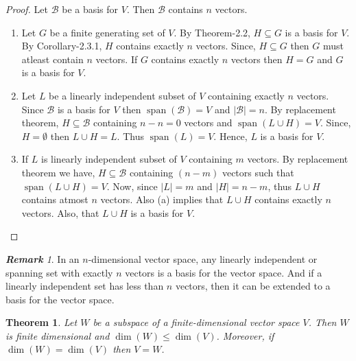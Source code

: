 \documentclass[12pt, a4paper]{article}
\newtheorem{theorem}{Theorem}[section]
\theoremstyle{definition}
\theoremstyle{remark}
\newtheorem*{remark}{\textbf{Remark}}
\newcommand{\B}{\mathscr{B}}
\DeclareMathOperator{\Span}{span}
\begin{document}
\begin{proof}
    Let $\B$ be a basis for $V$. Then $\B$ contains $n$ vectors.
    \begin{enumerate}
        \item Let $G$ be a finite generating set of $V$. By Theorem-2.2, $H \subseteq G$ is a basis for $V$. By Corollary-2.3.1, $H$ contains exactly $n$ vectors. Since, $H \subseteq G$ then $G$ must atleast contain $n$ vectors. If $G$ contains exactly $n$ vectors then $H = G$ and $G$ is a basis for $V$.
        \item Let $L$ be a linearly independent subset of $V$ containing exactly $n$ vectors. Since $\B$ is a basis for $V$ then $\Span(\B) = V$ and $|\B| = n$. By replacement theorem, $H \subseteq \B$ containing $n-n=0$ vectors and $\Span(L \cup H) = V$. Since, $H = \emptyset$ then $L \cup H = L$. Thus $\Span(L) = V$. Hence, $L$ is a basis for $V$.
        \item If $L$ is linearly independent subset of $V$ containing $m$ vectors. By replacement theorem we have, $H \subseteq \B$ containing $(n-m)$ vectors such that $\Span(L \cup H) = V$. Now, since $|L| = m$ and $|H| = n-m$, thus $L \cup H$ contains atmost $n$ vectors. Also (a) implies that $L \cup H$ contains exactly $n$ vectors. Also, that $L \cup H$ is a basis for $V$.
    \end{enumerate}
\end{proof}

\begin{remark}
    In an $n$-dimensional vector space, any linearly independent or spanning set with exactly $n$ vectors is a basis for the vector space. And if a linearly independent set has less than $n$ vectors, then it can be extended to a basis for the vector space.
\end{remark}

\begin{theorem}
    Let $W$ be a subspace of a finite-dimensional vector space $V$. Then $W$ is finite dimensional and $\dim(W) \leq \dim(V)$. Moreover, if $\dim(W) = \dim(V)$ then $V = W$.
\end{theorem}
\end{document}
